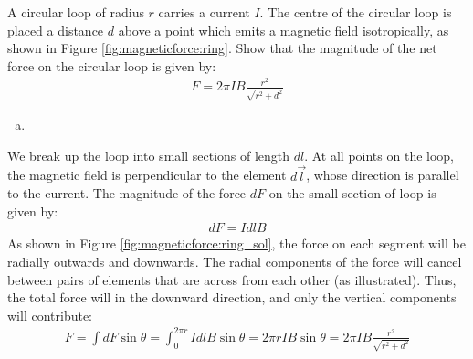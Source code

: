 \question A circular loop of radius $r$ carries a current $I$. The centre of the circular loop is placed a distance $d$ above a point which emits a magnetic field isotropically, as shown in Figure \ref{fig:magneticforce:ring}. Show that the magnitude of the net force on the circular loop is given by:
\begin{align*}
F=2\pi IB\frac{r^2}{\sqrt{r^2+d^2}}
\end{align*}
\begin{finalanswer}
\begin{enumerate}[(a)]
\item
\end{enumerate}
\end{finalanswer}
\begin{solution}
We break up the loop into small sections of length $dl$. At all points on the loop, the magnetic field is perpendicular to the element $d\vec l$, whose direction is parallel to the current. The magnitude of the force $dF$ on the small section of loop is given by:
\begin{align*}
dF=IdlB
\end{align*}
As shown in Figure \ref{fig:magneticforce:ring_sol}, the force on each segment will be radially outwards and downwards. The radial components of the force will cancel between pairs of elements that are across from each other (as illustrated). Thus, the total force will in the downward direction, and only the vertical components will contribute:
\begin{align*}
F=\int dF\sin\theta=\int_0^{2\pi r}IdlB\sin\theta=2\pi r IB\sin\theta=2\pi IB\frac{r^2}{\sqrt{r^2+d^2}}
\end{align*}

\end{solution}

